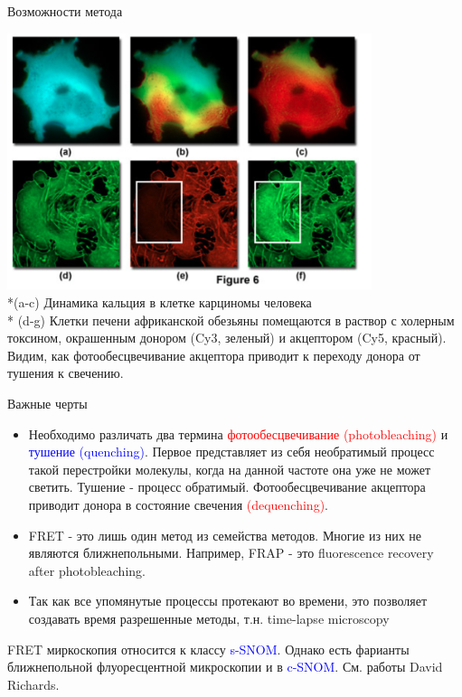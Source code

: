 \documentclass[9pt, compress, xcolor=table]{beamer}
\begin{document}
\begin{frame}{Возможности метода}

\begin{center}
\includegraphics[width=0.8\textwidth]{fret_images}
\\*(a-c) \small{Динамика кальция в клетке карциномы человека}
\\* (d-g) \small{Клетки печени африканской обезьяны помещаются в раствор с холерным токсином, окрашенным донором (Cy3, зеленый) и акцептором (Cy5, красный). Видим, как фотообесцвечивание акцептора приводит к переходу донора от тушения к свечению.}
\end{center}
\end{frame}

\begin{frame}{Важные черты}
\begin{itemize}
\item Необходимо различать два термина \textcolor{red}{фотообесцвечивание (photobleaching)} и \textcolor{blue}{тушение (quenching)}. Первое представляет из себя необратимый процесс такой перестройки молекулы, когда на данной частоте она уже не может светить. Тушение -  процесс обратимый. Фотообесцвечивание акцептора приводит донора в состояние свечения \textcolor{red}{(dequenching)}.
\item FRET - это лишь один метод из семейства методов. Многие из них не являются ближнепольными. Например, FRAP - это fluorescence recovery after photobleaching.
\item Так как все упомянутые процессы протекают во времени, это позволяет создавать время разрешенные методы, т.н. time-lapse microscopy
\end{itemize}

FRET миркоскопия относится к классу \textcolor{blue}{s-SNOM}. Однако есть фарианты ближнепольной флуоресцентной микроскопии и в \textcolor{blue}{c-SNOM}. См. работы David Richards.

\end{frame}
\end{document}
